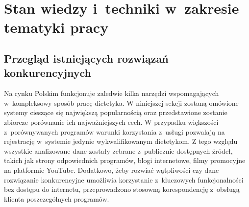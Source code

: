 \chapter{Stan wiedzy i~techniki w~zakresie tematyki pracy}\label{ch:knowladge-state}
\section{Przegląd istniejących rozwiązań konkurencyjnych}\label{sec:competitive-solutions}
Na rynku Polskim funkcjonuje zaledwie kilka narzędzi wspomagających w~kompleksowy sposób pracę dietetyka.
W niniejszej sekcji zostaną omówione systemy cieszące się największą popularnością oraz przedstawione zostanie zbiorcze porównanie ich najważniejszych cech.
W przypadku większości z~porównywanych programów warunki korzystania z~usługi pozwalają na rejestrację w~systemie jedynie wykwalifikowanym dietetykom.
Z tego względu wszystkie analizowane dane zostały zebrane z~publicznie dostępnych źródeł,
takich jak strony odpowiednich programów, blogi internetowe, filmy promocyjne na platformie YouTube\cite{url:youtube}.
Dodatkowo, żeby rozwiać wątpliwości czy dane rozwiązanie konkurencyjne umożliwia korzystanie z~kluczowych funkcjonalności bez dostępu do internetu, przeprowadzono stosowną korespondencję z~obsługą klienta poszczególnych programów.
